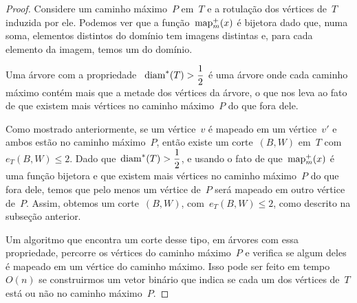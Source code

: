 	\begin{proof}
	Considere um caminho máximo~$P$ em~$T$ e a rotulação dos vértices
	de~$T$ induzida por ele.
	Podemos ver que a função~$\mathrm{map}^+_m(x)$ é bijetora dado que, numa
	soma, elementos distintos do domínio tem imagens distintas e, 
	para cada elemento da imagem, temos um do domínio.

	Uma árvore com a propriedade ~${\mathrm{diam}^*(T)>\dfrac{1}{2}}$ é uma
	árvore onde cada caminho máximo contém mais que a metade dos 
	vértices da árvore, o que nos leva ao fato de que existem mais 
	vértices no caminho máximo~$P$ do que fora dele. 

	Como mostrado anteriormente, se um vértice~$v$ é mapeado em um
	vértice~$v'$ e ambos estão no caminho máximo~$P$, então existe um
	corte~$(B,W)$ em~$T$ com~${e_T(B,W)\le 2}$.
	Dado que~${\mathrm{diam}^*(T)>\dfrac{1}{2}}$, e usando o fato de 
	que~$\mathrm{map}^+_m(x)$ é uma função bijetora e que
	existem mais vértices no caminho máximo~$P$ do que fora dele,
	temos que pelo menos um vértice de~$P$ será mapeado em
	outro vértice de~$P$. 
	Assim, obtemos um corte~$(B,W)$, com~$e_T(B,W)\le 2$,
	como descrito na subseção anterior.

	Um algoritmo que encontra um corte desse tipo, em árvores com 
	essa propriedade, percorre os vértices do caminho máximo~$P$
	e verifica se algum deles é mapeado em um vértice do caminho máximo.
	Isso pode ser feito em tempo~$O(n)$ se construirmos um vetor 
	binário que indica se cada um dos vértices de~$T$ está ou não no
	caminho máximo~$P$.
	\end{proof}
